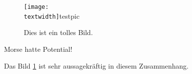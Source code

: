 \documentclass[ngerman]{article}
\begin{document}
\blindtext
\begin{figure}
\texttt{[image: \\textwidth]}{testpic}
\label{fig:testbild}
\caption{Dies ist ein tolles Bild.}
\end{figure}
\blintext
\begin{morsepotential}
Morse hatte Potential!
\end{morsepotential}
Das Bild \ref{fig:testbild} ist sehr aussagekräftig in diesem Zusammenhang.
\blindtext
\end{document}
